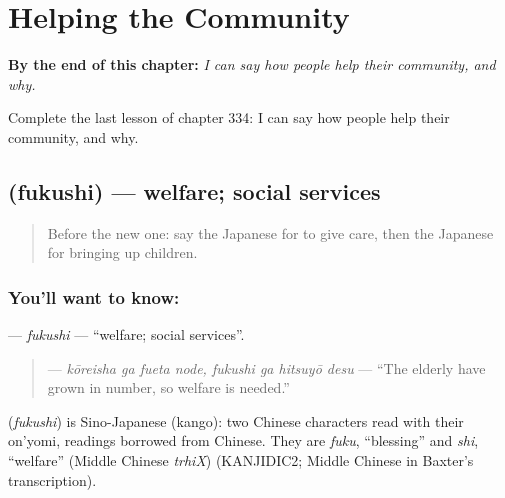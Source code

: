 
\chapter{Helping the Community}
\label{ch:ja-helping-the-community}

\begin{chapteropening}
\textbf{By the end of this chapter:} \emph{I can say how people help their community, and why.}

Complete the last lesson of chapter 334: I can say how people help their community, and why.
\end{chapteropening}

\section[\texorpdfstring{\ja{ふくし} (fukushi)}{ふくし (fukushi)}]{ (fukushi) — welfare; social services}

\label{lesson:JA-C334-fukushi}



\begin{quote}
Before the new one: say the Japanese for to give care, then the Japanese for bringing up children.
\end{quote}

\subsection*{You'll want to know: }
\textbf{} — \emph{fukushi} — \textquotedblleft{}welfare; social services\textquotedblright{}.

\begin{quote}
\textbf{  } — \emph{kōreisha ga fueta node, fukushi ga hitsuyō desu} — \textquotedblleft{}The elderly have grown in number, so welfare is needed.\textquotedblright{}
\end{quote}

\begin{cousinweb}
\textbf{} (\emph{fukushi}) is Sino-Japanese (kango): two Chinese characters read with their on'yomi, readings borrowed from Chinese. They are \emph{fuku}, \textquotedblleft{}blessing\textquotedblright{} and \emph{shi}, \textquotedblleft{}welfare\textquotedblright{} (Middle Chinese \emph{trhiX}) (KANJIDIC2; Middle Chinese in Baxter's transcription).
\end{cousinweb}

